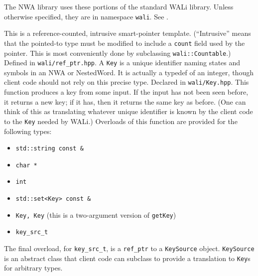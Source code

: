 The NWA library uses these portions of the standard WALi library. Unless
otherwise specified, they are in namespace \texttt{wali}. See \cite{wali}.

\begin{functionlist}
   This is a reference-counted, intrusive
    smart-pointer template. (``Intrusive'' means that the pointed-to type
    must be modified to include a \texttt{count} field used by the
    pointer. This is most conveniently done by subclassing
    \texttt{wali::Countable}.) Defined in \texttt{wali/ref\_ptr.hpp}.
   A \texttt{Key} is a unique identifier naming states and symbols in an
    NWA or NestedWord. It is actually a typedef of an integer, though client
    code should not rely on this precise type. Declared in
    \texttt{wali/Key.hpp}.
   This function produces a key from some input. If
    the input has not been seen before, it returns a new key; if it has, then
    it returns the same key as before. (One can think of this as translating
    whatever unique identifier is known by the client code to the
    \texttt{Key} needed by WALi.) Overloads of this function are provided for
    the following types:
    \begin{itemize}
      \item \texttt{std::string const \&}
      \item \texttt{char *}
      \item \texttt{int}
      \item \texttt{std::set<Key> const \&}
      \item \texttt{Key, Key} (this is a two-argument version of
        \texttt{getKey})
      \item \texttt{key\_src\_t}
    \end{itemize}

    The final overload, for \texttt{key\_src\_t}, is a \texttt{ref\_ptr} to a
    \texttt{KeySource} object. \texttt{KeySource} is an abstract class that
    client code can subclass to provide a translation to \texttt{Key}s for
    arbitrary types.


\end{functionlist}
